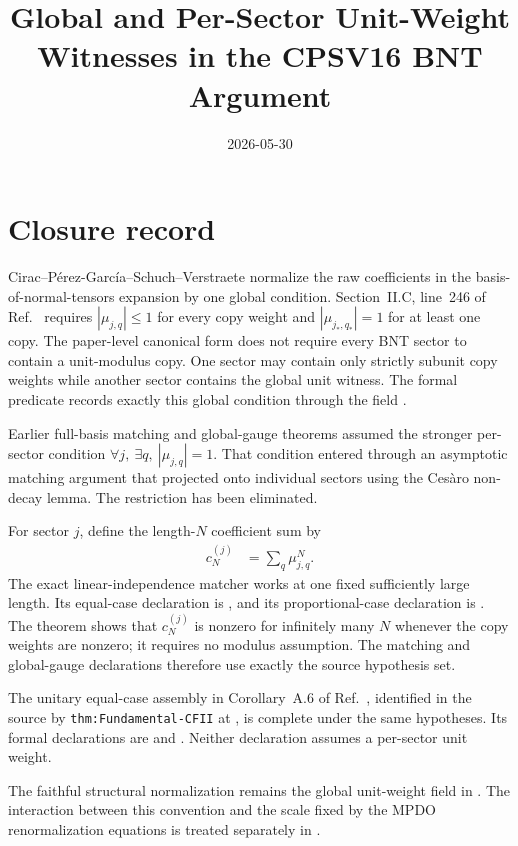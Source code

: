 \documentclass{article}
\title{Global and Per-Sector Unit-Weight Witnesses in the CPSV16 BNT Argument}
\author{}
\date{2026-05-30}
\begin{document}
\maketitle
{}

\section{Closure record}

Cirac--P\'erez-Garc\'ia--Schuch--Verstraete normalize the raw coefficients in
the basis-of-normal-tensors expansion by one global condition. Section~II.C,
line~246 of Ref.~\cite{Cirac2016MPDO_arXiv} requires
$|\mu_{j,q}|\leq 1$ for every copy weight and
$|\mu_{j_\ast,q_\ast}|=1$ for at least one copy. The paper-level canonical
form does not require every BNT sector to contain a unit-modulus copy. One
sector may contain only strictly subunit copy weights while another sector
contains the global unit witness. The formal predicate
 records exactly this global condition
through the field
.

Earlier full-basis matching and global-gauge theorems assumed the stronger
per-sector condition $\forall j,\ \exists q,\ |\mu_{j,q}|=1$. That condition
entered through an asymptotic matching argument that projected onto individual
sectors using the Ces\`aro non-decay lemma. The restriction has been
eliminated.

For sector $j$, define the length-$N$ coefficient sum by
\begin{align}
    c_N^{(j)}
        &= \sum_q \mu_{j,q}^N.
    \label{eq:cpsvunit_sector_coefficient_sum}
\end{align}
The exact linear-independence matcher works at one fixed sufficiently large
length. Its equal-case declaration is
, and its proportional-case
declaration is
. The
theorem
 shows that
$c_N^{(j)}$ is nonzero for infinitely many $N$ whenever the copy weights are
nonzero; it requires no modulus assumption. The matching and global-gauge
declarations therefore use exactly the source hypothesis set.

The unitary equal-case assembly in Corollary~A.6 of
Ref.~\cite{Cirac2016MPDO_arXiv}, identified in the source by
\texttt{thm:Fundamental-CFII} at
, is complete under the same
hypotheses. Its formal declarations are
 and
. Neither
declaration assumes a per-sector unit weight.

The faithful structural normalization remains the global unit-weight field
 in
. The interaction
between this convention and the scale fixed by the MPDO renormalization
equations is treated separately in
.



\end{document}
